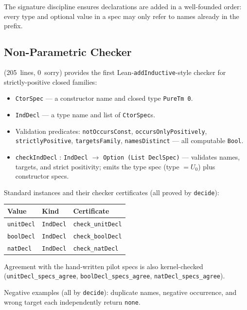 \documentclass[11pt]{article}
\theoremstyle{remark}
\newcommand{\code}[1]{\texttt{#1}}
\newcommand{\codepath}[1]{\path{#1}}
\newcommand{\leanref}[1]{\texttt{#1}}
\begin{document}
\noindent
The signature discipline ensures declarations are added in a well-founded order:
every type and optional value in a spec may only refer to names already
in the prefix.

\subsection{Non-Parametric Checker}

\codepath{InductiveDecl.lean} (205~lines, 0~sorry) provides the first
Lean-\code{addInductive}-style checker for strictly-positive closed families:

\begin{itemize}[nosep]
  \item \leanref{CtorSpec} --- a constructor name and closed type
  \leanref{PureTm 0}.
  \item \leanref{IndDecl} --- a type name and list of \leanref{CtorSpec}s.
  \item Validation predicates: \leanref{notOccursConst},
  \leanref{occursOnlyPositively}, \leanref{strictlyPositive},
  \leanref{targetsFamily}, \leanref{namesDistinct} --- all computable
  \leanref{Bool}.
  \item \leanref{checkIndDecl} : \leanref{IndDecl} $\to$
  \leanref{Option (List DeclSpec)} --- validates names, targets, and strict
  positivity; emits the type spec (type $= U_0$) plus constructor specs.
\end{itemize}

\noindent
Standard instances and their checker certificates (all proved by
\code{decide}):
\begin{center}
\small
\begin{tabular}{@{}lll@{}}
\toprule
Value & Kind & Certificate \\
\midrule
\leanref{unitDecl} & \leanref{IndDecl} & \leanref{check\_unitDecl} \\
\leanref{boolDecl} & \leanref{IndDecl} & \leanref{check\_boolDecl} \\
\leanref{natDecl}  & \leanref{IndDecl} & \leanref{check\_natDecl} \\
\bottomrule
\end{tabular}
\end{center}

\noindent
Agreement with the hand-written pilot specs is also kernel-checked
(\leanref{unitDecl\_specs\_agree}, \leanref{boolDecl\_specs\_agree},
\leanref{natDecl\_specs\_agree}).

\noindent
Negative examples (all by \code{decide}): duplicate names, negative occurrence,
and wrong target each independently return \leanref{none}.
\end{document}
